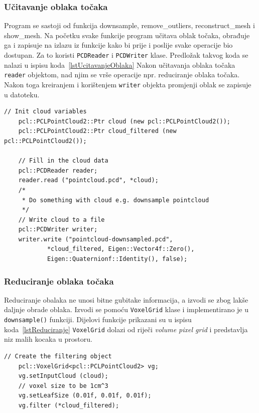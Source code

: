 
\subsubsection{Učitavanje oblaka točaka} %
\label{ssub:Učitavanje oblaka točaka}
Program se sastoji od funkcija downsample, remove\_outliers,
reconstruct\_mesh i show\_mesh. Na početku svake funkcije program
učitava oblak točaka, obrađuje ga i zapisuje na izlazu iz funkcije kako
bi prije i poslije svake operacije bio dostupan. Za to koristi
\texttt{PCDReader} i \texttt{PCDWriter} klase. Predložak takvog koda se
nalazi u ispisu koda~\ref{lstUcitavanjeOblaka} Nakon učitavanja oblaka
točaka \texttt{reader} objektom, nad njim se vrše operacije npr.
reduciranje oblaka točaka. Nakon toga kreiranjem i korištenjem
\texttt{writer} objekta promjenji oblak se zapisuje u datoteku.

\begin{lstlisting}[label=lstUcitavanjeOblaka, caption={Predložak izvornog
koda za učitavanje oblaka točaka}]
    // Init cloud variables 
    pcl::PCLPointCloud2::Ptr cloud (new pcl::PCLPointCloud2());
    pcl::PCLPointCloud2::Ptr cloud_filtered (new pcl::PCLPointCloud2());

    // Fill in the cloud data
    pcl::PCDReader reader;
    reader.read ("pointcloud.pcd", *cloud);
    /* 
     * Do something with cloud e.g. downsample pointcloud
     */
    // Write cloud to a file
    pcl::PCDWriter writer;
    writer.write ("pointcloud-downsampled.pcd",
            *cloud_filtered, Eigen::Vector4f::Zero(),
            Eigen::Quaternionf::Identity(), false);
\end{lstlisting}


\newpage
\subsubsection{Reduciranje oblaka točaka} %
\label{ssub:Reduciranje oblaka točaka}
Reduciranje obalaka ne unosi bitne gubitake informacija, a izvodi se
zbog lakše daljnje obrade oblaka. Izvodi se pomoću \texttt{VoxelGrid}
klase i implementirano je u \texttt{downsample()} funkciji. Dijelovi
funkcije prikazani su u ispisu koda~\ref{lstReduciranje}
\texttt{VoxelGrid} dolazi od riječi \textit{volume pixel grid} i
predstavlja niz malih kocaka u prostoru.

\begin{lstlisting}[label=lstReduciranje, caption={Dio izvornog koda za
reduciranje točaka iz funkcije \texttt{downsample()} }]
    // Create the filtering object
    pcl::VoxelGrid<pcl::PCLPointCloud2> vg;
    vg.setInputCloud (cloud);
    // voxel size to be 1cm^3
    vg.setLeafSize (0.01f, 0.01f, 0.01f);
    vg.filter (*cloud_filtered);
\end{lstlisting}

